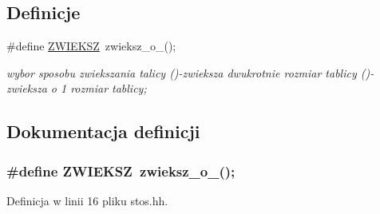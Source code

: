 \subsection*{\-Definicje}
\begin{DoxyCompactItemize}
\item 
\#define \hyperlink{stos_8hh_acae4ff3359f7dda2fe2d2e82ec017d2c}{\-Z\-W\-I\-E\-K\-S\-Z}~zwieksz\-\_\-o\-\_();
\begin{DoxyCompactList}\small\item\em wybor sposobu zwiekszania talicy ()-\/zwieksza dwukrotnie rozmiar tablicy ()-\/zwieksza o 1 rozmiar tablicy; \end{DoxyCompactList}\end{DoxyCompactItemize}


\subsection{\-Dokumentacja definicji}
\hypertarget{stos_8hh_acae4ff3359f7dda2fe2d2e82ec017d2c}{
\subsubsection[{\-Z\-W\-I\-E\-K\-S\-Z}]{\setlength{\rightskip}{0pt plus 5cm}\#define {\bf \-Z\-W\-I\-E\-K\-S\-Z}~zwieksz\-\_\-o\-\_();}}\label{stos_8hh_acae4ff3359f7dda2fe2d2e82ec017d2c}


\-Definicja w linii 16 pliku stos.\-hh.

